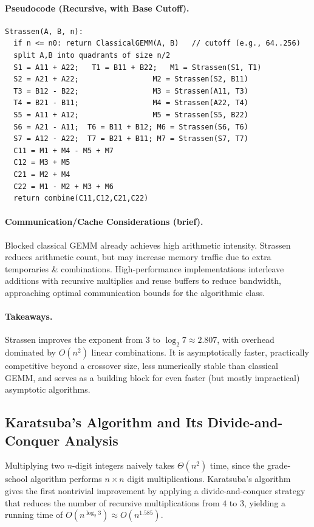 \documentclass[9pt]{extarticle}
\begin{document}
\paragraph{Pseudocode (Recursive, with Base Cutoff).}
\begin{verbatim}
Strassen(A, B, n):
  if n <= n0: return ClassicalGEMM(A, B)   // cutoff (e.g., 64..256)
  split A,B into quadrants of size n/2
  S1 = A11 + A22;   T1 = B11 + B22;   M1 = Strassen(S1, T1)
  S2 = A21 + A22;                 M2 = Strassen(S2, B11)
  T3 = B12 - B22;                 M3 = Strassen(A11, T3)
  T4 = B21 - B11;                 M4 = Strassen(A22, T4)
  S5 = A11 + A12;                 M5 = Strassen(S5, B22)
  S6 = A21 - A11;  T6 = B11 + B12; M6 = Strassen(S6, T6)
  S7 = A12 - A22;  T7 = B21 + B11; M7 = Strassen(S7, T7)
  C11 = M1 + M4 - M5 + M7
  C12 = M3 + M5
  C21 = M2 + M4
  C22 = M1 - M2 + M3 + M6
  return combine(C11,C12,C21,C22)
\end{verbatim}

\paragraph{Communication/Cache Considerations (brief).}
Blocked classical GEMM already achieves high arithmetic intensity. Strassen reduces arithmetic count, but may increase memory traffic due to extra temporaries \& combinations. High-performance implementations interleave additions with recursive multiplies and reuse buffers to reduce bandwidth, approaching optimal communication bounds for the algorithmic class.

\paragraph{Takeaways.}
Strassen improves the exponent from $3$ to $\log_2 7\approx 2.807$, with overhead dominated by $O(n^2)$ linear combinations. It is asymptotically faster, practically competitive beyond a crossover size, less numerically stable than classical GEMM, and serves as a building block for even faster (but mostly impractical) asymptotic algorithms.
\subsection{Karatsuba's Algorithm and Its Divide-and-Conquer Analysis}

Multiplying two $n$-digit integers naively takes $\Theta(n^2)$ time, since the
grade-school algorithm performs $n \times n$ digit multiplications.  
Karatsuba's algorithm gives the first nontrivial improvement by applying a 
divide-and-conquer strategy that reduces the number of recursive multiplications
from $4$ to $3$, yielding a running time of $O(n^{\log_2 3}) \approx O(n^{1.585})$.
\end{document}
